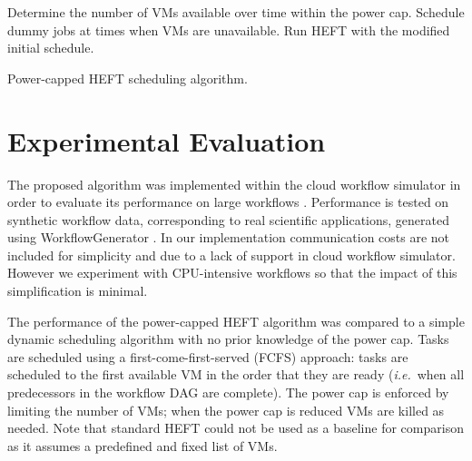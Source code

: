 \documentclass[10pt, conference, compsocconf]{IEEEtran} %
\newcommand{\ie}{\textit{i.e.}\ }
\begin{document}
\begin{algorithm}
  \begin{algorithmic}[1]
    \State Determine the number of VMs available over time within the power cap.
    \State Schedule dummy jobs at times when VMs are unavailable.
    \State Run HEFT with the modified initial schedule.


  \end{algorithmic}
  \caption{Power-capped HEFT scheduling algorithm.}
  \label{alg:power-capped-heft}
\end{algorithm}

\section{Experimental Evaluation}

The proposed algorithm was implemented within the cloud workflow simulator in order to evaluate its performance on large workflows \cite{CloudWorkflowSimulator,malawski2012cost}.
Performance is tested on synthetic workflow data, corresponding to real scientific applications, generated using WorkflowGenerator \cite{WorkflowGenerator,Silva2014WorkflowGenerator}.
In our implementation communication costs are not included for simplicity and due to a lack of support in cloud workflow simulator.
However we experiment with CPU-intensive workflows \cite{Bharathi2008} so that the impact of this simplification is minimal.

The performance of the power-capped HEFT algorithm was compared to a simple dynamic scheduling algorithm with no prior knowledge of the power cap.
Tasks are scheduled using a first-come-first-served (FCFS) approach: tasks are scheduled to the first available VM in the order that they are ready (\ie when all predecessors in the workflow DAG are complete).
The power cap is enforced by limiting the number of VMs; when the power cap is reduced VMs are killed as needed.
Note that standard HEFT could not be used as a baseline for comparison as it assumes a predefined and fixed list of VMs.
\end{document}
